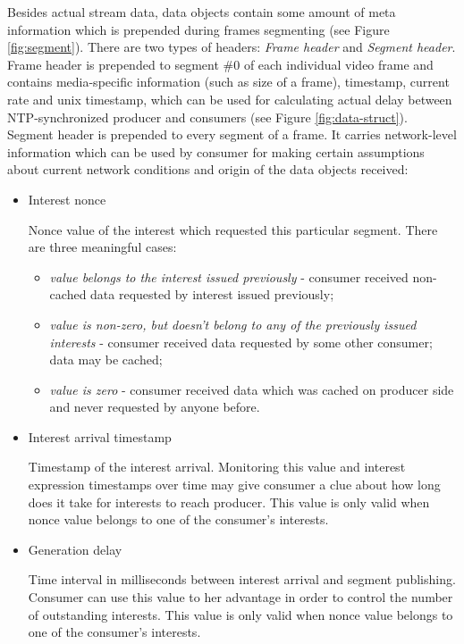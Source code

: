 \documentclass[10pt]{icn/sig-alternate-10pt} %
\begin{document}
Besides actual stream data, data objects contain some amount of meta information which is prepended during frames segmenting (see Figure \ref{fig:segment}). There are two types of headers: \textit{Frame header} and \textit{Segment header}. Frame header is prepended to segment \#0 of each individual video frame and contains media-specific information (such as size of a frame), timestamp, current rate and unix timestamp, which can be used for calculating actual delay between NTP-synchronized producer and consumers (see Figure \ref{fig:data-struct}). Segment header is prepended to every segment of a frame. It carries network-level information which can be used by consumer for making certain assumptions about current network conditions and origin of the data objects received:
\begin{itemize}
\item Interest nonce

Nonce value of the interest which requested this particular segment. There are three meaningful cases: 
\begin{itemize}
\item \textit{value belongs to the interest issued previously} - consumer received non-cached data requested by interest issued previously;
\item \textit{value is non-zero, but doesn't belong to any of the previously issued interests} - consumer received data requested by some other consumer; data may be cached;
\item \textit{value is zero} - consumer received data which was cached on producer side and never requested by anyone before.
\end{itemize}

\item Interest arrival timestamp

Timestamp of the interest arrival. Monitoring this value and interest expression timestamps over time may give consumer a clue about how long does it take for interests to reach producer. This value is only valid when nonce value belongs to one of the consumer's interests.

\item Generation delay

Time interval in milliseconds between interest arrival and segment publishing. Consumer can use this value to her advantage in order to control the number of outstanding interests. This value is only valid when nonce value belongs to one of the consumer's interests.

\end{itemize}
\end{document}
